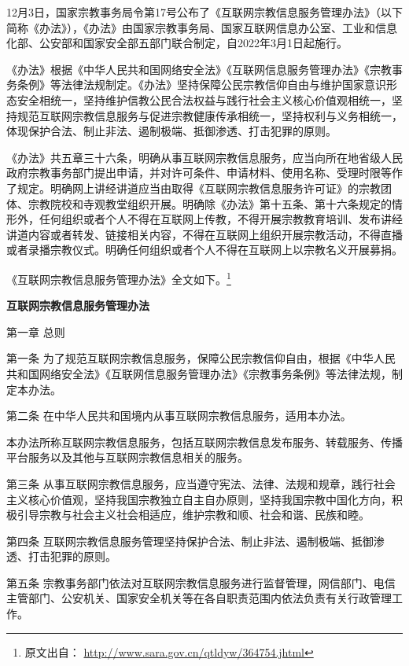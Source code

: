 \documentclass[UTF8, 11pt, oneside]{ctexart}
\newcommand{\juzhong}[1]{\begin{center}#1\end{center}}
\newcommand{\kongge}{\hspace{0.5em}}
\begin{document}
12月3日，国家宗教事务局令第17号公布了《互联网宗教信息服务管理办法》（以下简称《办法》），《办法》由国家宗教事务局、国家互联网信息办公室、工业和信息化部、公安部和国家安全部五部门联合制定，自2022年3月1日起施行。

《办法》根据《中华人民共和国网络安全法》《互联网信息服务管理办法》《宗教事务条例》等法律法规制定。《办法》坚持保障公民宗教信仰自由与维护国家意识形态安全相统一，坚持维护信教公民合法权益与践行社会主义核心价值观相统一，坚持规范互联网宗教信息服务与促进宗教健康传承相统一，坚持权利与义务相统一，体现保护合法、制止非法、遏制极端、抵御渗透、打击犯罪的原则。

《办法》共五章三十六条，明确从事互联网宗教信息服务，应当向所在地省级人民政府宗教事务部门提出申请，并对许可条件、申请材料、使用名称、受理时限等作了规定。明确网上讲经讲道应当由取得《互联网宗教信息服务许可证》的宗教团体、宗教院校和寺观教堂组织开展。明确除《办法》第十五条、第十六条规定的情形外，任何组织或者个人不得在互联网上传教，不得开展宗教教育培训、发布讲经讲道内容或者转发、链接相关内容，不得在互联网上组织开展宗教活动，不得直播或者录播宗教仪式。明确任何组织或者个人不得在互联网上以宗教名义开展募捐。

《互联网宗教信息服务管理办法》全文如下。\footnote{原文出自： \url{http://www.sara.gov.cn/qtldyw/364754.jhtml}}

\newpage

\juzhong{\Large\textbf{互联网宗教信息服务管理办法}}

\juzhong{第一章 \kongge 总则}

第一条 \kongge 为了规范互联网宗教信息服务，保障公民宗教信仰自由，根据《中华人民共和国网络安全法》《互联网信息服务管理办法》《宗教事务条例》等法律法规，制定本办法。

第二条 \kongge 在中华人民共和国境内从事互联网宗教信息服务，适用本办法。

本办法所称互联网宗教信息服务，包括互联网宗教信息发布服务、转载服务、传播平台服务以及其他与互联网宗教信息相关的服务。

第三条 \kongge 从事互联网宗教信息服务，应当遵守宪法、法律、法规和规章，践行社会主义核心价值观，坚持我国宗教独立自主自办原则，坚持我国宗教中国化方向，积极引导宗教与社会主义社会相适应，维护宗教和顺、社会和谐、民族和睦。

第四条 \kongge 互联网宗教信息服务管理坚持保护合法、制止非法、遏制极端、抵御渗透、打击犯罪的原则。

第五条 \kongge 宗教事务部门依法对互联网宗教信息服务进行监督管理，网信部门、电信主管部门、公安机关、国家安全机关等在各自职责范围内依法负责有关行政管理工作。
\end{document}

